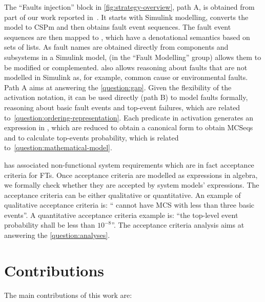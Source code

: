 \documentclass[12pt,openright,twoside,a4paper,oldfontcommands,english,brazil,final]{abntex2}
\theoremstyle{theo}
\newcommand{\simulink}{Simulink\xspace}
\begin{document}
The ``Faults injection'' block in \cref{fig:strategy-overview}, path A, is obtained from part of our work reported in~\cite{DM2012,Didier2012}.
It starts with \simulink modelling, converts the model to \ac{CSPm} and then obtains fault event sequences.
The fault event sequences are then mapped to , which have a denotational semantics based on sets of lists.
As fault names are obtained directly from components and subsystems in a \simulink model,  (in the ``Fault Modelling'' group) allows them to be modified or complemented.
 also allows reasoning about faults that are not modelled in \simulink as, for example, common cause or environmental faults.
Path A aims at answering the \cref{question:gap}.
Given the flexibility of the \ac{activation} notation, it can be used directly (path B) to model faults formally, reasoning about basic fault events and top-event failures, which are related to~\ref{question:ordering-representation}.
Each predicate in \ac{activation} generates an expression in , which are reduced to obtain a canonical form to obtain \acp{MCSeq} and to calculate top-events probability, which is related to~\ref{question:mathematical-model}.

 has associated non-functional system requirements which are in fact acceptance criteria for \acp{FT}.
Once acceptance criteria are modelled as expressions in \ac{algebra}, we formally check whether they are accepted by system models' expressions.
The acceptance criteria can be either qualitative or quantitative.
An example of qualitative acceptance criteria is: `` cannot have \ac{MCS} with less than three basic events''.
A quantitative acceptance criteria example is: ``the top-level event probability shall be less than $10^{-8}$''.
The acceptance criteria analysis aims at answering the \ref{question:analyses}.

\section{Contributions}

The main contributions of this work are:
\end{document}
